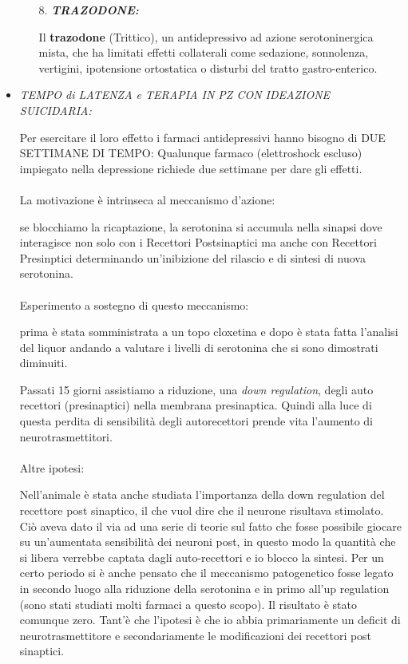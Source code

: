 \begin{itemize}
\begin{itemize}
\item[8.] \textbf{\emph{TRAZODONE:}}

Il \textbf{trazodone} (Trittico), un antidepressivo ad azione
serotoninergica mista, che ha limitati effetti collaterali come
sedazione, sonnolenza, vertigini, ipotensione ortostatica o disturbi del
tratto gastro-enterico.
\end{itemize}

\item
  \emph{TEMPO di LATENZA e TERAPIA IN PZ CON IDEAZIONE SUICIDARIA:}

Per esercitare il loro effetto i farmaci antidepressivi hanno bisogno di
DUE SETTIMANE DI TEMPO: Qualunque farmaco (elettroshock escluso)
impiegato nella depressione richiede due settimane per dare gli effetti.
\\\\
La motivazione è intrinseca al meccanismo d'azione:

se blocchiamo la ricaptazione, la serotonina si accumula nella sinapsi
dove interagisce non solo con i Recettori Postsinaptici ma anche con
Recettori Presinptici determinando un'inibizione del rilascio e di
sintesi di nuova serotonina.
\\\\
Esperimento a sostegno di questo meccanismo:

prima è stata somministrata a un topo cloxetina e dopo è stata fatta
l'analisi del liquor andando a valutare i livelli di serotonina che si
sono dimostrati diminuiti.

Passati 15 giorni assistiamo a riduzione, una \emph{down regulation},
degli auto recettori (presinaptici) nella membrana presinaptica. Quindi
alla luce di questa perdita di sensibilità degli autorecettori prende
vita l'aumento di neurotrasmettitori.
\\\\
Altre ipotesi:

Nell'animale è stata anche studiata l'importanza della down regulation
del recettore post sinaptico, il che vuol dire che il neurone risultava
stimolato. Ciò aveva dato il via ad una serie di teorie sul fatto che
fosse possibile giocare su un'aumentata sensibilità dei neuroni post, in
questo modo la quantità che si libera verrebbe captata dagli
auto-recettori e io blocco la sintesi. Per un certo periodo si è anche
pensato che il meccanismo patogenetico fosse legato in secondo luogo
alla riduzione della serotonina e in primo all'up regulation (sono stati
studiati molti farmaci a questo scopo). Il risultato è stato comunque
zero. Tant'è che l'ipotesi è che io abbia primariamente un deficit di
neurotrasmettitore e secondariamente le modificazioni dei recettori post
sinaptici.


\end{itemize}
